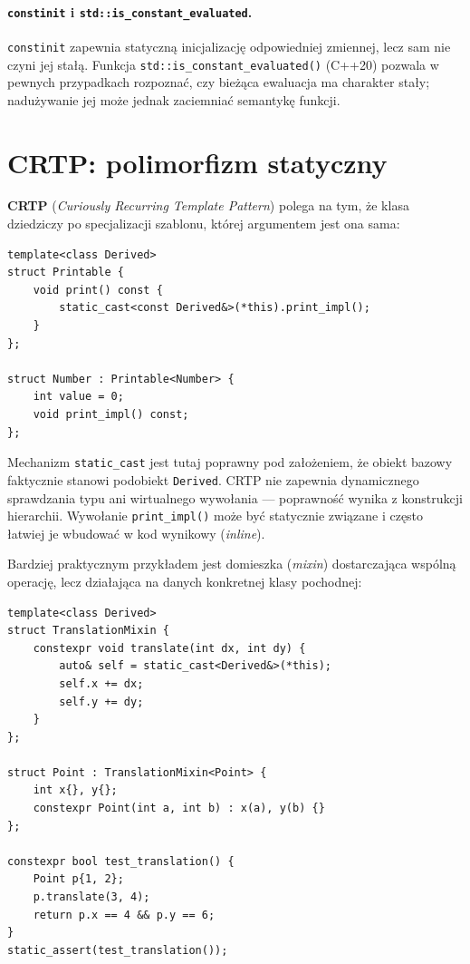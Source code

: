 \paragraph{\texttt{constinit} i \texttt{std::is\_constant\_evaluated}.}
\texttt{constinit} zapewnia statyczną inicjalizację odpowiedniej
zmiennej, lecz sam nie czyni jej stałą. Funkcja
\texttt{std::is\_constant\_evaluated()} (C++20) pozwala w
pewnych przypadkach rozpoznać, czy bieżąca ewaluacja ma charakter
stały; nadużywanie jej może jednak zaciemniać semantykę funkcji.

\section{CRTP: polimorfizm statyczny}
\label{sec:cpp9-crtp}

\textbf{CRTP} (\textit{Curiously Recurring Template Pattern}) polega na
tym, że klasa dziedziczy po specjalizacji szablonu, której argumentem
jest ona sama:

\begin{lstlisting}
template<class Derived>
struct Printable {
    void print() const {
        static_cast<const Derived&>(*this).print_impl();
    }
};

struct Number : Printable<Number> {
    int value = 0;
    void print_impl() const;
};
\end{lstlisting}

Mechanizm \texttt{static\_cast} jest tutaj poprawny pod założeniem,
że obiekt bazowy faktycznie stanowi podobiekt \texttt{Derived}.
CRTP nie zapewnia dynamicznego sprawdzania typu ani wirtualnego
wywołania — poprawność wynika z konstrukcji hierarchii. Wywołanie
\texttt{print\_impl()} może być statycznie związane i często
łatwiej je wbudować w kod wynikowy (\textit{inline}).

Bardziej praktycznym przykładem jest domieszka (\textit{mixin})
dostarczająca wspólną operację, lecz działająca na danych
konkretnej klasy pochodnej:

\begin{lstlisting}
template<class Derived>
struct TranslationMixin {
    constexpr void translate(int dx, int dy) {
        auto& self = static_cast<Derived&>(*this);
        self.x += dx;
        self.y += dy;
    }
};

struct Point : TranslationMixin<Point> {
    int x{}, y{};
    constexpr Point(int a, int b) : x(a), y(b) {}
};

constexpr bool test_translation() {
    Point p{1, 2};
    p.translate(3, 4);
    return p.x == 4 && p.y == 6;
}
static_assert(test_translation());
\end{lstlisting}


